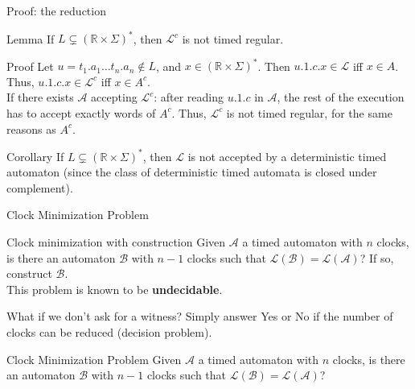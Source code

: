 \begin{frame}{Proof: the reduction}

	\begin{block}{Lemma}
		If $L \subsetneq (\mathbb{R}\times\Sigma)^*$, then $\mathcal{L}^c$ is not timed regular.
	\end{block}
	
	\begin{block}{Proof}
	Let $u = t_1.a_1\dots t_n.a_n \not\in L$, and $x \in (\mathbb{R}\times\Sigma)^*$. Then $u.1.c.x \in \mathcal{L}$ iff $x \in A$. Thus, $u.1.c.x \in \mathcal{L}^c$ iff $x \in A^c$.\\

	If there exists $\mathcal{A}$ accepting $\mathcal{L}^c$: after reading $u.1.c$ in $\mathcal{A}$, the rest of the execution has to accept exactly words of $A^c$. Thus, $\mathcal{L}^c$ is not timed regular, for the same reasons as $A^c$.
	\end{block}
	
	\begin{block}{Corollary}
		If $L \subsetneq (\mathbb{R}\times\Sigma)^*$, then $\mathcal{L}$ is not accepted by a deterministic timed automaton (since the class of deterministic timed automata is closed under complement).
	\end{block}

\end{frame}


\begin{frame}{Clock Minimization Problem}

  \begin{alertblock}{Clock minimization with construction}
    Given $\mathcal{A}$ a timed automaton with $n$ clocks, is there an automaton $\mathcal{B}$ with $n-1$ clocks such that $\mathcal{L(B)=L(A)}$? If so, construct $\mathcal{B}$.\\
    This problem is known to be \textbf{undecidable}.
  \end{alertblock}
  \vfill
  \begin{exampleblock}{What if we don't ask for a witness?}
    Simply answer Yes or No if the number of clocks can be reduced (decision problem).
  \end{exampleblock}

  \begin{alertblock}{Clock Minimization Problem}
    Given $\mathcal{A}$ a timed automaton with $n$ clocks, is there an automaton $\mathcal{B}$ with $n-1$ clocks such that $\mathcal{L(B)=L(A)}$?
  \end{alertblock}
\end{frame}


